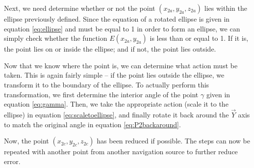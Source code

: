 \documentclass{IEEEtran}
\begin{document}
Next, we need determine whether or not the point $(x_{2a}, y_{2a}, z_{2a})$ lies within
the ellipse previously defined.  Since the equation of a rotated ellipse is given in
equation \ref{eq:ellipse} and must be equal to 1 in order to form an ellipse, we can
simply check whether the function $E(x_{2a}, y_{2a})$ is less than or equal to 1.  If it
is, the point lies on or inside the ellipse; and if not, the point lies outside.

Now that we know where the point is, we can determine what action must be taken.  This
is again fairly simple -- if the point lies outside the ellipse, we transform it to the
boundary of the ellipse.  To actually perform this transformation, we first determine the
interior angle of the point $\gamma$ given in equation \ref{eq:gamma}.  Then, we take
the appropriate action (scale it to the ellipse) in equation \ref{eq:scaletoellipse}, and
finally rotate it back around the $\vec{Y}$ axis to match the original angle in equation
\ref{eq:P2backaround}.

Now, the point $(x_{2c}, y_{2c}, z_{2c})$ has been reduced if possible.  The steps can now
be repeated with another point from another navigation source to further reduce error.
\end{document}
